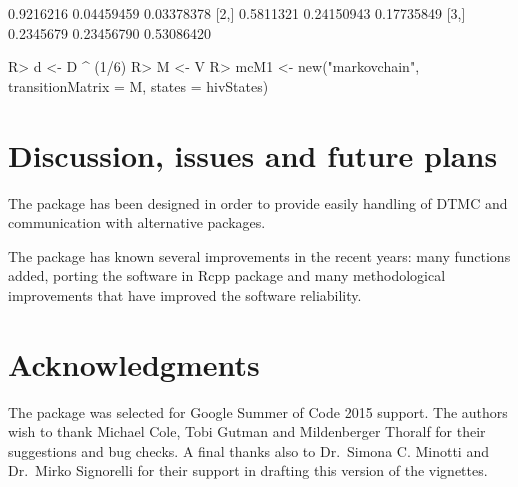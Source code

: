 \documentclass[
  nojss]{jss}
\begin{document}
\begin{CodeChunk}


\begin{CodeOutput}
          [,1]       [,2]       [,3]
[1,] 0.9216216 0.04459459 0.03378378
[2,] 0.5811321 0.24150943 0.17735849
[3,] 0.2345679 0.23456790 0.53086420
\end{CodeOutput}

\begin{CodeInput}
R> d <- D ^ (1/6)
R> M <- V %
R> mcM1 <- new("markovchain", transitionMatrix = M, states = hivStates)
\end{CodeInput}
\end{CodeChunk}

\hypertarget{discussion-issues-and-future-plans}{%
\section{Discussion, issues and future plans}\label{discussion-issues-and-future-plans}}

The  package has been designed in order to provide easily handling of DTMC and communication with alternative packages.

The package has known several improvements in the recent years: many functions added, porting the software in Rcpp  package \citep{RcppR} and many methodological improvements that have improved the software reliability.

\hypertarget{sec:aknowledgements}{%
\section{Acknowledgments}\label{sec:aknowledgements}}

The package was selected for Google Summer of Code 2015 support. The authors wish to thank Michael Cole, Tobi Gutman and Mildenberger Thoralf for their suggestions and bug checks. A final thanks also to Dr.~Simona C. Minotti and Dr.~Mirko Signorelli for their support in drafting this version of the vignettes.

\clearpage

\renewcommand\refname{References}

\end{document}
